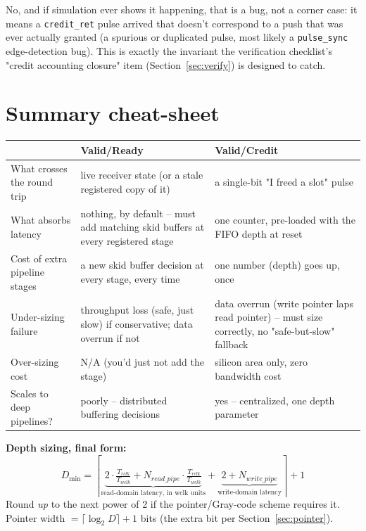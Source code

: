 \documentclass[12pt]{article}
\begin{document}
\begin{description}[leftmargin=1.2em, style=nextline]
\item[\normalfont\bfseries "Can \texttt{credit\_cnt} ever legitimately
exceed $D$?"]
No, and if simulation ever shows it happening, that is a bug, not a corner
case: it means a \texttt{credit\_ret} pulse arrived that doesn't correspond
to a push that was ever actually granted (a spurious or duplicated pulse,
most likely a \texttt{pulse\_sync} edge-detection bug). This is exactly
the invariant the verification checklist's "credit accounting closure"
item (Section~\ref{sec:verify}) is designed to catch.
\end{description}

\clearpage
\section{Summary cheat-sheet}

\begin{center}
\renewcommand{\arraystretch}{1.3}
\begin{tabular}{@{}p{4.3cm}p{5.4cm}p{5.4cm}@{}}
\toprule
& \textbf{Valid/Ready} & \textbf{Valid/Credit} \\
\midrule
What crosses the round trip & live receiver state (or a stale registered
copy of it) & a single-bit "I freed a slot" pulse \\
What absorbs latency & nothing, by default -- must add matching skid
buffers at every registered stage & one counter, pre-loaded with the FIFO
depth at reset \\
Cost of extra pipeline stages & a new skid buffer decision at every stage,
every time & one number (depth) goes up, once \\
Under-sizing failure & throughput loss (safe, just slow) if conservative;
data overrun if not & data overrun (write pointer laps read pointer) --
must size correctly, no "safe-but-slow" fallback \\
Over-sizing cost & N/A (you'd just not add the stage) & silicon area only,
zero bandwidth cost \\
Scales to deep pipelines? & poorly -- distributed buffering decisions & yes
-- centralized, one depth parameter \\
\bottomrule
\end{tabular}
\end{center}

\begin{formulabox}
\textbf{Depth sizing, final form:}
\[
D_{\min} = \left\lceil \underbrace{2\cdot\tfrac{T_{rclk}}{T_{wclk}} + N_{read\_pipe}\cdot\tfrac{T_{rclk}}{T_{wclk}}}_{\text{read-domain latency, in wclk units}} + \underbrace{2 + N_{write\_pipe}}_{\text{write-domain latency}} \right\rceil + 1
\]
Round \emph{up} to the next power of 2 if the pointer/Gray-code scheme
requires it. Pointer width $= \lceil \log_2 D \rceil + 1$ bits (the extra
bit per Section~\ref{sec:pointer}).
\end{formulabox}
\end{document}

